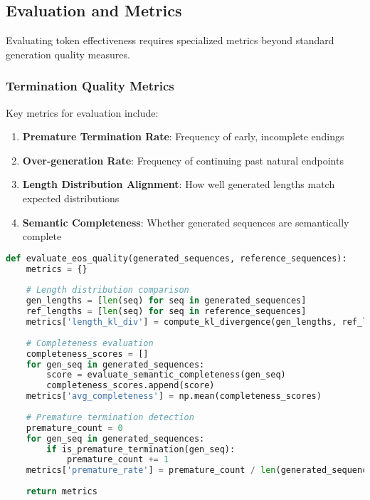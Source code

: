 \subsection{Evaluation and Metrics}

Evaluating \eos{} token effectiveness requires specialized metrics beyond standard generation quality measures.

\subsubsection{Termination Quality Metrics}

Key metrics for \eos{} evaluation include:

\begin{enumerate}
\item \textbf{Premature Termination Rate}: Frequency of early, incomplete endings
\item \textbf{Over-generation Rate}: Frequency of continuing past natural endpoints
\item \textbf{Length Distribution Alignment}: How well generated lengths match expected distributions
\item \textbf{Semantic Completeness}: Whether generated sequences are semantically complete
\end{enumerate}

\begin{lstlisting}[language=Python, caption=EOS evaluation metrics]
def evaluate_eos_quality(generated_sequences, reference_sequences):
    metrics = {}
    
    # Length distribution comparison
    gen_lengths = [len(seq) for seq in generated_sequences]
    ref_lengths = [len(seq) for seq in reference_sequences]
    metrics['length_kl_div'] = compute_kl_divergence(gen_lengths, ref_lengths)
    
    # Completeness evaluation
    completeness_scores = []
    for gen_seq in generated_sequences:
        score = evaluate_semantic_completeness(gen_seq)
        completeness_scores.append(score)
    metrics['avg_completeness'] = np.mean(completeness_scores)
    
    # Premature termination detection
    premature_count = 0
    for gen_seq in generated_sequences:
        if is_premature_termination(gen_seq):
            premature_count += 1
    metrics['premature_rate'] = premature_count / len(generated_sequences)
    
    return metrics
\end{lstlisting}

